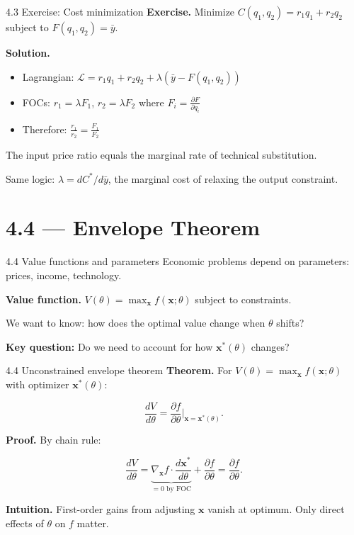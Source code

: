 \documentclass[11pt,aspectratio=169]{beamer}
\newcommand{\THFrame}[1]{\begin{frame}{#1 \quad {\small\textcolor{mAccent}{Take home}}}}
\begin{document}
\THFrame{4.3 Exercise: Cost minimization}
  \small
  \textbf{Exercise.} Minimize $C(q_1, q_2) = r_1q_1 + r_2q_2$ subject to $F(q_1, q_2) = \bar{y}$.
  
  \textbf{Solution.}
  
  \begin{itemize}
    \item Lagrangian: $\mathcal{L} = r_1q_1 + r_2q_2 + \lambda(\bar{y} - F(q_1, q_2))$
    
    \item FOCs: $r_1 = \lambda F_1$, $r_2 = \lambda F_2$ where $F_i = \frac{\partial F}{\partial q_i}$
    
    \item Therefore: $\frac{r_1}{r_2} = \frac{F_1}{F_2}$
  \end{itemize}
  
  The input price ratio equals the marginal rate of technical substitution.
  
  Same logic: $\lambda = dC^*/d\bar{y}$, the marginal cost of relaxing the output constraint.
\end{frame}

\section{4.4 --- Envelope Theorem}

\begin{frame}{4.4 Value functions and parameters}
  \small
  Economic problems depend on parameters: prices, income, technology.
  
  \textbf{Value function.} $V(\theta) = \max_{\mathbf{x}} f(\mathbf{x}; \theta)$ subject to constraints.
  
  We want to know: how does the optimal value change when $\theta$ shifts?
  
  \textbf{Key question:} Do we need to account for how $\mathbf{x}^*(\theta)$ changes?
\end{frame}

\begin{frame}{4.4 Unconstrained envelope theorem}
  \small
  \textbf{Theorem.} For $V(\theta) = \max_{\mathbf{x}} f(\mathbf{x}; \theta)$ with optimizer $\mathbf{x}^*(\theta)$:
  
  \[
    \frac{dV}{d\theta} = \frac{\partial f}{\partial \theta}\Big|_{\mathbf{x}=\mathbf{x}^*(\theta)}.
  \]
  
  \textbf{Proof.} By chain rule:
  
  \[
    \frac{dV}{d\theta} = \underbrace{\nabla_{\mathbf{x}}f \cdot \frac{d\mathbf{x}^*}{d\theta}}_{=0 \text{ by FOC}} + \frac{\partial f}{\partial \theta} = \frac{\partial f}{\partial \theta}.
  \]
  
  \textbf{Intuition.} First-order gains from adjusting $\mathbf{x}$ vanish at optimum. Only direct effects of $\theta$ on $f$ matter.
\end{frame}
\end{document}
